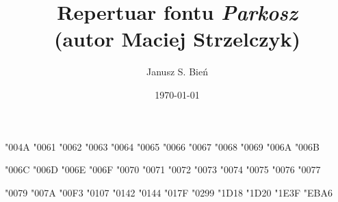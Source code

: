 \documentclass{article}
\author{Janusz S. Bień}
\title{Repertuar fontu \textit{Parkosz}\\(autor Maciej Strzelczyk)}
\date{\today}
\begin{document}
\maketitle
\thispagestyle{empty}


\enspace\char"004A
\enspace\char"0061
\enspace\char"0062
\enspace\char"0063
\enspace\char"0064
\enspace\char"0065
%
\enspace\char"0066
\enspace\char"0067
\enspace\char"0068
\enspace\char"0069
\enspace\char"006A
\enspace\char"006B

\enspace\char"006C
\enspace\char"006D
\enspace\char"006E
\enspace\char"006F
\enspace\char"0070
\enspace\char"0071
%
\enspace\char"0072
\enspace\char"0073
\enspace\char"0074
\enspace\char"0075
\enspace\char"0076
\enspace\char"0077

\enspace\char"0079
\enspace\char"007A
\enspace\char"00F3
\enspace\char"0107
\enspace\char"0142
\enspace\char"0144
%
\enspace\char"017F
\enspace\char"0299
\enspace\char"1D18
\enspace\char"1D20
\enspace\char"1E3F
\enspace\char"EBA6
\end{document}
